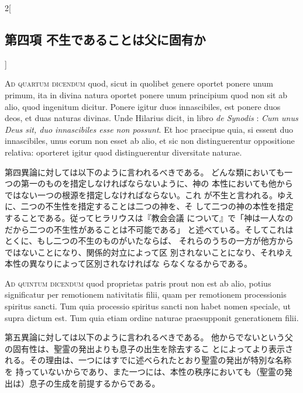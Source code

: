 \documentclass[paper=a4paper,fontsize=10pt,jafontsize=9pt,titlepage]{jlreq}
\begin{document}
\begin{paracol}{2}[\subsection{第四項 不生であることは父に固有か}]
\switchcolumn*[\subsection{ad.4}]


{\scshape Ad quartum dicendum} quod, sicut in quolibet genere oportet ponere unum
primum, ita in divina natura oportet ponere unum principium quod non
sit ab alio, quod ingenitum dicitur. Ponere igitur duos innascibiles,
est ponere duos deos, et duas naturas divinas. Unde Hilarius dicit, in
libro {\itshape de Synodis} : {\itshape Cum unus Deus sit, duo innascibiles esse non
possunt}. Et hoc praecipue quia, si essent duo innascibiles, unus eorum
non esset ab alio, et sic non distinguerentur oppositione relativa:
oporteret igitur quod distinguerentur diversitate naturae.


\switchcolumn


第四異論に対しては以下のように言われるべきである。
どんな類においても一つの第一のものを措定しなければならないように、神の
 本性においても他からではない一つの根源を措定しなければならない。これ
 が不生と言われる。ゆえに、二つの不生性を措定することは二つの神を、そ
 して二つの神の本性を措定することである。従ってヒラリウスは『教会会議
 について』で「神は一人なのだから二つの不生性があることは不可能である」
 と述べている。そしてこれはとくに、もし二つの不生のものがいたならば、
 それらのうちの一方が他方からではないことになり、関係的対立によって区
 別されないことになり、それゆえ本性の異なりによって区別されなければな
 らなくなるからである。


\switchcolumn*[\subsection{ad.5}]


{\scshape Ad quintum dicendum} quod proprietas patris prout non est ab alio,
potius significatur per remotionem nativitatis filii, quam per
remotionem processionis spiritus sancti. Tum quia processio spiritus
sancti non habet nomen speciale, ut supra dictum est. Tum quia etiam
ordine naturae praesupponit generationem filii.


\switchcolumn


第五異論に対しては以下のように言われるべきである。
他からでないという父の固有性は、聖霊の発出よりも息子の出生を除去するこ
 とによってより表示される。その理由は、一つにはすでに述べられたとおり聖霊の発出が特別な名称を
 持っていないからであり、また一つには、本性の秩序においても（聖霊の発
 出は）息子の生成を前提するからである。



\end{paracol}
\end{document}
